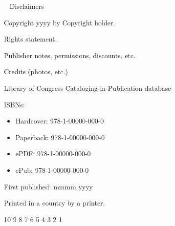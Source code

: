 \thispagestyle{empty}
~\vfill
Disclaimers

\medskip
Copyright \textcopyright yyyy by Copyright holder.

Rights statement.

\medskip
Publisher notes, permissions, discounts, etc.

\medskip
Credits (photos, etc.)

\medskip
Library of Congress Cataloging-in-Publication database

\medskip
ISBNs:
\begin{itemize}
    \item Hardcover: 978-1-00000-000-0
    \item Paperback: 978-1-00000-000-0
    \item ePDF: 978-1-00000-000-0
    \item ePub: 978-1-00000-000-0
\end{itemize}

\medskip
First published: mmmm yyyy

Printed in a country by a printer.

10 9 8 7 6 5 4 3 2 1

